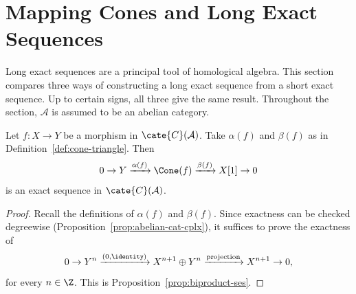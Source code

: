 
\section{Mapping Cones and Long Exact Sequences}\label{sec:cone-vs-long-exact-sequence}
\hypertarget{o014.aljabr2.chapter3.mapping-cone-and-long-exact-sequences}{ }

Long exact sequences are a principal tool of homological algebra. This section
compares three ways of constructing a long exact sequence from a short exact
sequence. Up to certain signs, all three give the same result. Throughout the
section, $\mathcal{A}$ is assumed to be an abelian category.

\begin{proposition}\label{prop:cone-triangle-ses}
	Let $f:X\to Y$ be a morphism in $\cate{C}(\mathcal{A})$. Take
	$\alpha(f)$ and $\beta(f)$ as in Definition~\ref{def:cone-triangle}. Then
	\[ 0 \to Y \xrightarrow{\alpha(f)} \Cone(f) \xrightarrow{\beta(f)} X[1] \to 0 \]
	is an exact sequence in $\cate{C}(\mathcal{A})$.
\end{proposition}

\begin{proof}
	Recall the definitions of $\alpha(f)$ and $\beta(f)$. Since exactness can
	be checked degreewise (Proposition~\ref{prop:abelian-cat-cplx}), it
	suffices to prove the exactness of
	\[ 0 \to Y^n \xrightarrow{(0, \identity)} X^{n+1} \oplus Y^n \xrightarrow{\text{projection}} X^{n+1} \to 0, \]
	for every $n\in\Z$. This is Proposition~\ref{prop:biproduct-ses}.
\end{proof}


